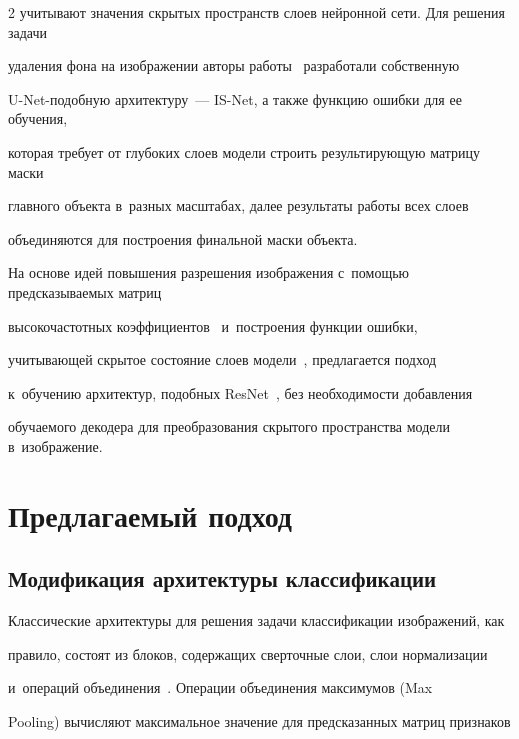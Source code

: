\begin{multicols}{2}
учитывают значения скрытых пространств слоев нейронной сети. Для решения задачи 


удаления фона на изображении авторы работы~\cite{IS_NET} разработали собственную 


U-Net-подобную архитектуру~--- IS-Net, а также функцию ошибки для ее обуче\-ния, 


которая требует от глубоких слоев модели строить результирующую матрицу маски 


главного объекта в~разных масштабах, далее результаты работы всех слоев 


объединяются для построения финальной маски объекта.





На основе идей повышения разрешения изоб\-ра\-же\-ния с~помощью предсказываемых матриц 


высокочастотных коэффициентов~\cite{DWB} и~по\-стро\-ения функции ошибки, 


учи\-ты\-ва\-ющей скрытое со\-сто\-яние слоев модели~\cite{IS_NET}, предлагается подход 


к~обуче\-нию архитектур, подобных ResNet~\cite{ResNet}, без не\-об\-хо\-ди\-мости до\-бав\-ле\-ния 


обучаемого декодера для преобразования скрытого пространства модели в~изоб\-ра\-же\-ние.








\section{Предлагаемый подход}





\subsection{Модификация архитектуры классификации}





Классические архитектуры для решения задачи классификации изображений, как 


правило, состоят из блоков, содержащих сверточные слои, слои нормализации 


и~операций объединения~\cite{POOLOPS}. Операции объединения максимумов (Max 


Pooling) вычисляют максимальное значение для предсказанных матриц признаков 



\end{multicols}

